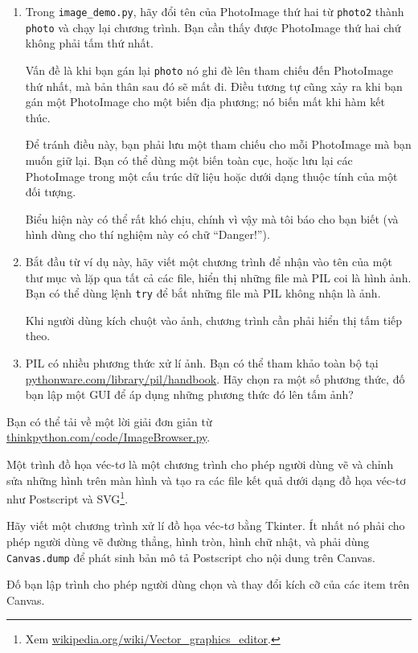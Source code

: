 \documentclass[11pt]{book}
\begin{document}
\begin{ex}
\begin{enumerate}
\item Trong \verb"image_demo.py", hãy đổi tên của
PhotoImage thứ hai từ {\tt photo2} thành {\tt photo} và chạy lại chương trình.
Bạn cần thấy được PhotoImage thứ hai chứ không phải tấm thứ nhất.

Vấn đề là khi bạn gán lại {\tt photo} nó ghi đè lên
tham chiếu đến PhotoImage thứ nhất, mà bản thân sau đó sẽ mất đi. Điều 
tương tự cũng xảy ra khi bạn gán một PhotoImage cho một biến
địa phương; nó biến mất khi hàm kết thúc.

Để tránh điều này, bạn phải lưu một tham chiếu cho mỗi
PhotoImage mà bạn muốn giữ lại. Bạn có thể dùng một biến toàn cục,
hoặc lưu lại các PhotoImage trong một cấu trúc dữ liệu hoặc dưới dạng
thuộc tính của một đối tượng.

Biểu hiện này có thể rất khó chịu, chính vì vậy mà tôi báo cho bạn biết
(và hình dùng cho thí nghiệm này có chữ ``Danger!'').


\item Bắt đầu từ ví dụ này, hãy viết một chương trình để nhận vào tên
của một thư mục và lặp qua tất cả các file, hiển thị 
những file mà PIL coi là hình ảnh. Bạn có thể dùng lệnh {\tt try}
để bắt những file mà PIL không nhận là ảnh.

Khi người dùng kích chuột vào ảnh, chương trình cần phải hiển thị tấm tiếp theo.

\item PIL có nhiều phương thức xử lí ảnh. Bạn có thể tham khảo toàn bộ
tại \url{pythonware.com/library/pil/handbook}.
Hãy chọn ra một số phương thức, đố bạn lập một GUI để áp dụng những
phương thức đó lên tấm ảnh?

\end{enumerate}

Bạn có thể tải về một lời giải đơn giản từ
\url{thinkpython.com/code/ImageBrowser.py}.

\end{ex}


\begin{ex}


Một trình đồ họa véc-tơ là một chương trình cho phép người dùng vẽ
và chỉnh sửa những hình trên màn hình và tạo ra các file kết quả
dưới dạng đồ họa véc-tơ như Postscript và SVG\footnote{Xem
  \url{wikipedia.org/wiki/Vector_graphics_editor}.}.

Hãy viết một chương trình xử lí đồ họa véc-tơ bằng Tkinter.
Ít nhất nó phải cho phép người dùng vẽ đường thẳng, hình tròn,
hình chữ nhật, và phải dùng {\tt Canvas.dump} để 
phát sinh bản mô tả Postscript cho nội dung trên
Canvas.

Đố bạn lập trình cho phép người dùng chọn và thay đổi kích cỡ
của các item trên Canvas.

\end{ex}
\end{document}
